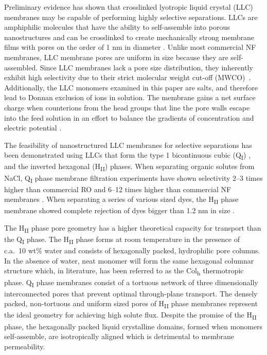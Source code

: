 \documentclass[journal=jpcbfk,manuscript=article]{achemso}
\begin{document}
  Preliminary evidence has shown that crosslinked lyotropic liquid crystal
  (LLC) membranes may be capable of performing highly selective separations. LLCs
  are amphiphilic molecules that have the ability to self-assemble into porous
  nanostructures \cite{smith_ordered_1997} and can be crosslinked to create
  mechanically strong membrane films with pores on the order of 1 nm in diameter
  \cite{zhou_supported_2005}. Unlike most commercial NF membranes, LLC membrane
  pores are uniform in size because they are self-assembled.  Since LLC membranes
  lack a pore size distribution, they inherently exhibit high selectivity due to
  their strict molecular weight cut-off (MWCO)~\cite{zhou_supported_2005}.
  Additionally, the LLC monomers examined in this paper are salts, and therefore
  lead to Donnan exclusion of ions in solution. The membrane gains a net surface
  charge when counterions from the head groups that line the pore walls escape
  into the feed solution in an effort to balance the gradients of concentration
  and electric potential \cite{donnan_theory_1995}.    

  The feasibility of nanostructured LLC membranes for selective separations has been
  demonstrated using LLCs that form the type 1 bicontinuous cubic (Q\textsubscript{I})
  \cite{hatakeyama_water_2011,hatakeyama_nanoporous_2010,carter_glycerol-based_2012},
  and the inverted hexagonal (H\textsubscript{II}) \cite{zhou_supported_2005}
  phases. When 
  separating organic solutes from NaCl, Q\textsubscript{I} phase membrane filtration
  experiments have shown selectivity 2--3 times higher than commercial RO and
  6--12 times higher than commercial NF membranes \cite{dischinger_application_2017}.
  When separating a series of various sized dyes, the H\textsubscript{II} phase membrane
  showed complete rejection of dyes bigger than 1.2 nm in size \cite{zhou_supported_2005}. 

  The H\textsubscript{II} phase pore geometry has a higher theoretical capacity
  for transport than the Q\textsubscript{I} phase. The H\textsubscript{II} phase forms
  at room temperature in the presence of c.a.~10 wt\% water and consists of hexagonally
  packed, hydrophilic pore columns\cite{smith_ordered_1997}. In the absence of
  water, neat monomer will form the same hexagonal columnar structure which, in
  literature, has been referred to as the Col\textsubscript{h} thermotropic
  phase\cite{feng_scalable_2014}. 
  Q\textsubscript{I} phase membranes consist of a tortuous network of three dimensionally 
  interconnected pores that prevent optimal through-plane transport. The densely packed, 
  non-tortuous and uniform sized pores of H\textsubscript{II} phase membranes represent
  the ideal geometry for achieving high solute flux\cite{matyka_tortuosity-porosity_2008}.
  Despite the promise of the H\textsubscript{II} phase, the hexagonally packed
  liquid crystalline domains, formed when monomers self-assemble, are
  isotropically aligned which is detrimental to membrane permeability. 
\end{document}
